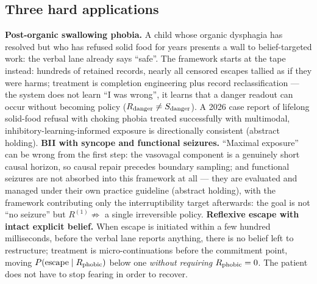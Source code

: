 \documentclass[9pt,twocolumn]{article}
\begin{document}
\subsection{Three hard applications}
\textbf{Post-organic swallowing phobia.} A child whose organic dysphagia has resolved but who has refused solid food for years presents a wall to belief-targeted work: the verbal lane already says ``safe''. The framework starts at the tape instead: hundreds of retained records, nearly all censored escapes tallied as if they were harms; treatment is completion engineering plus record reclassification --- the system does not learn ``I was wrong'', it learns that a danger readout can occur without becoming policy ($R_{\rm danger}\neq S_{\rm danger}$). A 2026 case report of lifelong solid-food refusal with choking phobia treated successfully with multimodal, inhibitory-learning-informed exposure is directionally consistent \cite{finn2026} (abstract holding). \textbf{BII with syncope and functional seizures.} ``Maximal exposure'' can be wrong from the first step: the vasovagal component is a genuinely short causal horizon, so causal repair precedes boundary sampling; and functional seizures are not absorbed into this framework at all --- they are evaluated and managed under their own practice guideline \cite{tolchin2026} (abstract holding), with the framework contributing only the interruptibility target afterwards: the goal is not ``no seizure'' but $R^{(1)}\not\Rightarrow$ a single irreversible policy. \textbf{Reflexive escape with intact explicit belief.} When escape is initiated within a few hundred milliseconds, before the verbal lane reports anything, there is no belief left to restructure; treatment is micro-continuations before the commitment point, moving $P(\text{escape}\mid R_{\rm phobic})$ below one \emph{without requiring} $R_{\rm phobic}=0$. The patient does not have to stop fearing in order to recover.
\end{document}
